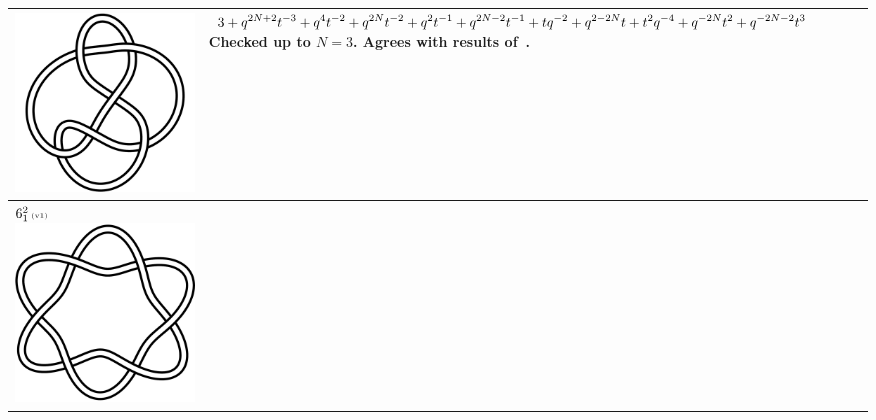 \documentclass{compositio}
\theoremstyle{definition}
\numberwithin{equation}{section}
\begin{document}
{\begin{longtable}{p{}|p{}}
\includegraphics[scale=0.07,angle=0]{knot6_3.pdf} 
& 
$
\displaystyle{%
3+q^{2N+2} t^{-3} + q^4t^{-2}+ q^{2 N}t^{-2}+ q^2 t^{-1}+ q^{2 N-2}t^{-1}+ t q^{-2}+q^{2-2 N} t+ t^2q^{-4}+q^{-2 N} t^2+q^{-2N-2} t^3
}
$
\newline\newline\newline\newline
Checked up to $N=3$. Agrees with results of~\cite{r0508510, r0607544}. 
\\
\hline
$6_{1}^2\,\text{{\tiny (v1)}}$ 
\includegraphics[scale=0.07,angle=0]{link6_1_2.pdf} 

\end{longtable}}
\end{document}
